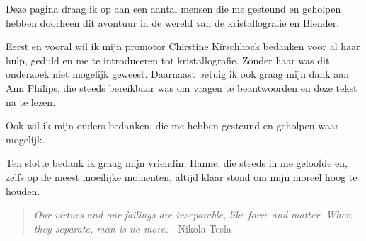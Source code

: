 Deze pagina draag ik op aan een aantal mensen die me gesteund en geholpen hebben doorheen dit avontuur in de wereld van de kristallografie en Blender.
\par
Eerst en vooral wil ik mijn promotor Chirstine Kirschhock bedanken voor al haar hulp, geduld en me te introduceren tot kristallografie. Zonder haar was dit onderzoek niet mogelijk geweest. Daarnaast betuig ik ook graag mijn dank aan Ann Philips, die steeds bereikbaar was om vragen te beantwoorden en deze tekst na te lezen.
\par
Ook wil ik mijn ouders bedanken, die me hebben gesteund en geholpen waar mogelijk.   
\par
Ten slotte bedank ik graag mijn vriendin, Hanne, die steeds in me geloofde en, zelfs op de meest moeilijke momenten, altijd klaar stond om mijn moreel hoog te houden. 

\par
\begin{quote}
\textit{Our virtues and our failings are inseparable, like force and matter. When they separate, man is no more.} - Nikola Tesla
\end{quote}


	   
